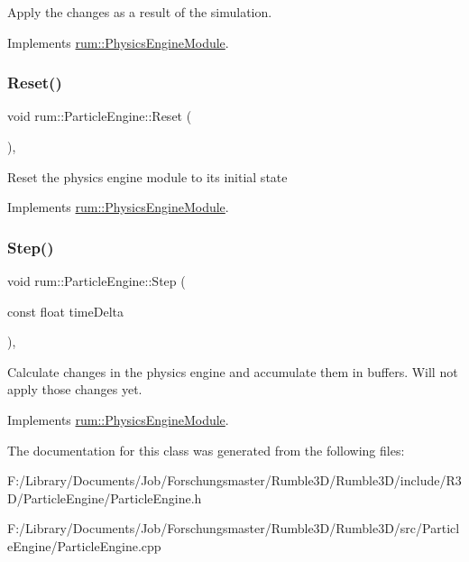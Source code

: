 Apply the changes as a result of the simulation. 

Implements \hyperlink{classrum_1_1_physics_engine_module_a8635a9194b86cf3c70723ebb4e8c967c}{rum\+::\+Physics\+Engine\+Module}.

\mbox{\label{classrum_1_1_particle_engine_af1249c80ca75209f08b88f76b94a60f9}} 
\subsubsection{\texorpdfstring{Reset()}{Reset()}}
{\footnotesize\ttfamily void rum\+::\+Particle\+Engine\+::\+Reset (\begin{DoxyParamCaption}{ }\end{DoxyParamCaption})\hspace{0.3cm}{\ttfamily [override]}, {\ttfamily [virtual]}}

Reset the physics engine module to its initial state 

Implements \hyperlink{classrum_1_1_physics_engine_module_a1ee77a3a48ced8291a86506e6904ca9e}{rum\+::\+Physics\+Engine\+Module}.

\mbox{\label{classrum_1_1_particle_engine_ac25c2f442c5ca9ace806384797cbe0a6}} 
\subsubsection{\texorpdfstring{Step()}{Step()}}
{\footnotesize\ttfamily void rum\+::\+Particle\+Engine\+::\+Step (\begin{DoxyParamCaption}\item[{const float}]{time\+Delta }\end{DoxyParamCaption})\hspace{0.3cm}{\ttfamily [override]}, {\ttfamily [virtual]}}

Calculate changes in the physics engine and accumulate them in buffers. Will not apply those changes yet. 

Implements \hyperlink{classrum_1_1_physics_engine_module_a0c8bfcf27aee16f05ef9a83948f330ac}{rum\+::\+Physics\+Engine\+Module}.



The documentation for this class was generated from the following files\+:\begin{DoxyCompactItemize}
\item 
F\+:/\+Library/\+Documents/\+Job/\+Forschungsmaster/\+Rumble3\+D/\+Rumble3\+D/include/\+R3\+D/\+Particle\+Engine/Particle\+Engine.\+h\item 
F\+:/\+Library/\+Documents/\+Job/\+Forschungsmaster/\+Rumble3\+D/\+Rumble3\+D/src/\+Particle\+Engine/Particle\+Engine.\+cpp\end{DoxyCompactItemize}
